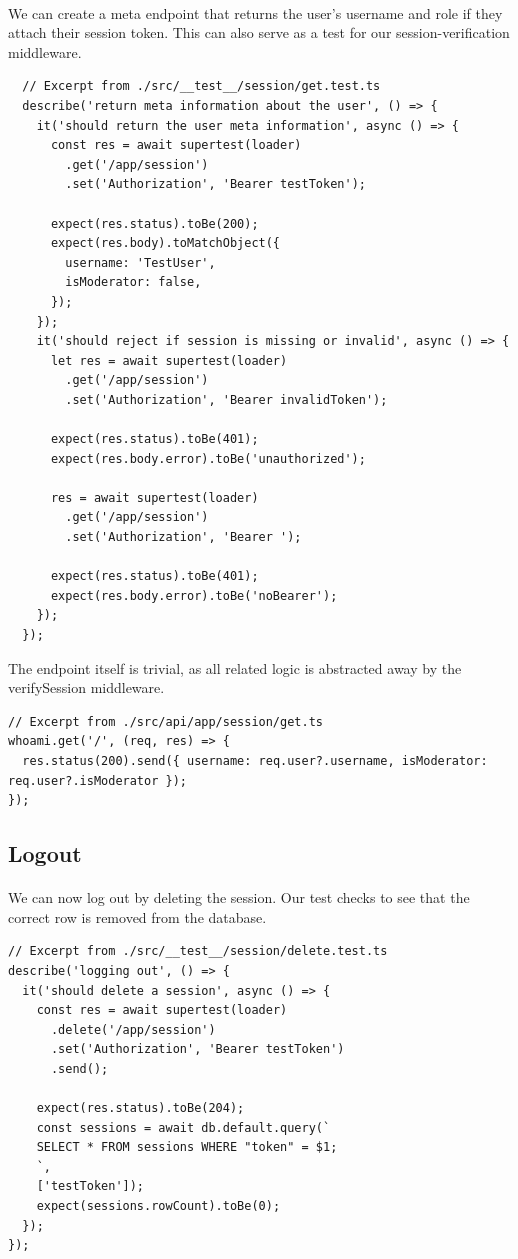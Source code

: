 \documentclass{report}
\begin{document}
\paragraph{}
We can create a meta endpoint that returns the user's username and role if they attach their session token. This can also serve as a test for our session-verification middleware.
\begin{verbatim}
  // Excerpt from ./src/__test__/session/get.test.ts
  describe('return meta information about the user', () => {
    it('should return the user meta information', async () => {
      const res = await supertest(loader)
        .get('/app/session')
        .set('Authorization', 'Bearer testToken');
  
      expect(res.status).toBe(200);
      expect(res.body).toMatchObject({
        username: 'TestUser',
        isModerator: false,
      });
    });
    it('should reject if session is missing or invalid', async () => {
      let res = await supertest(loader)
        .get('/app/session')
        .set('Authorization', 'Bearer invalidToken');
  
      expect(res.status).toBe(401);
      expect(res.body.error).toBe('unauthorized');
  
      res = await supertest(loader)
        .get('/app/session')
        .set('Authorization', 'Bearer ');
  
      expect(res.status).toBe(401);
      expect(res.body.error).toBe('noBearer');
    });
  });
\end{verbatim}

The endpoint itself is trivial, as all related logic is abstracted away by the verifySession middleware.
\begin{verbatim}
// Excerpt from ./src/api/app/session/get.ts
whoami.get('/', (req, res) => {
  res.status(200).send({ username: req.user?.username, isModerator: req.user?.isModerator });
});
\end{verbatim}

\subsection{Logout}
\paragraph{}
We can now log out by deleting the session. Our test checks to see that the correct row is removed from the database.

\begin{verbatim}
// Excerpt from ./src/__test__/session/delete.test.ts
describe('logging out', () => {
  it('should delete a session', async () => {
    const res = await supertest(loader)
      .delete('/app/session')
      .set('Authorization', 'Bearer testToken')
      .send();

    expect(res.status).toBe(204);
    const sessions = await db.default.query(`
    SELECT * FROM sessions WHERE "token" = $1;
    `,
    ['testToken']);
    expect(sessions.rowCount).toBe(0);
  });
});
\end{verbatim}
\end{document}
